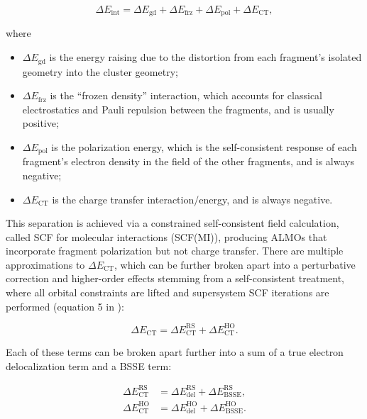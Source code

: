 \begin{equation}
  \label{eq:almo-eda}
  \Delta E_{\text{int}} = \Delta E_{\text{gd}} + \Delta E_{\text{frz}} + \Delta E_{\text{pol}} + \Delta E_{\text{CT}},
\end{equation}

where

\begin{itemize}
\item \(\Delta E_{\text{gd}}\) is the energy raising due to the distortion from each fragment's isolated geometry into the cluster geometry;
\item \(\Delta E_{\text{frz}}\) is the ``frozen density'' interaction, which accounts for classical electrostatics and Pauli repulsion between the fragments, and is usually positive;
\item \(\Delta E_{\text{pol}}\) is the polarization energy, which is the self-consistent response of each fragment's electron density in the field of the other fragments, and is always negative;
\item \(\Delta E_{\text{CT}}\) is the charge transfer interaction/energy, and is always negative.
\end{itemize}

This separation is achieved via a constrained self-consistent field calculation, called SCF for molecular interactions (SCF(MI)), producing ALMOs that incorporate fragment polarization but not charge transfer. There are multiple approximations to \(\Delta E_{\text{CT}}\), which can be further broken apart into a perturbative correction and higher-order effects stemming from a self-consistent treatment, where all orbital constraints are lifted and supersystem SCF iterations are performed (equation 5 in ):

\begin{equation}
  \label{eq:almo-eda-ct}
  \Delta E_{\text{CT}} = \Delta E_{\text{CT}}^{\text{RS}} + \Delta E_{\text{CT}}^{\text{HO}}.
\end{equation}

Each of these terms can be broken apart further into a sum of a true electron delocalization term and a BSSE term:

\begin{equation}
  \begin{aligned}
    \label{eq:almo-eda-ct-bsse}
    \Delta E_{\text{CT}}^{\text{RS}} &= \Delta E_{\text{del}}^{\text{RS}} + \Delta E_{\text{BSSE}}^{\text{RS}}, \\
    \Delta E_{\text{CT}}^{\text{HO}} &= \Delta E_{\text{del}}^{\text{HO}} + \Delta E_{\text{BSSE}}^{\text{HO}}.
  \end{aligned}
\end{equation}

